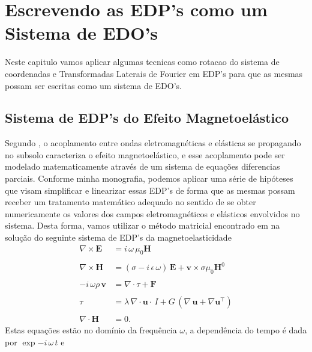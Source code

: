 \chapter{Escrevendo as EDP's como um Sistema de EDO's}
Neste capitulo vamos aplicar algumas tecnicas como rotacao do sistema de coordenadas e Transformadas Laterais de Fourier em EDP's para que as mesmas possam ser escritas como um sistema de EDO's.

\section{Sistema de EDP's do Efeito Magnetoel\'astico}

Segundo \cite{eringen_1963}, o acoplamento entre ondas eletromagn\'eticas e el\'asticas se propagando no subsolo caracteriza o efeito magnetoel\'astico, e esse acoplamento pode ser modelado matematicamente atrav\'es de um sistema de equa\c{c}\~oes diferencias parciais. Conforme minha monografia, podemos aplicar uma s\'erie de hip\'oteses que visam simplificar e linearizar essas EDP's de forma que as mesmas possam receber um tratamento matem\'atico adequado no sentido de se obter numericamente os valores dos campos eletromagn\'eticos e el\'asticos envolvidos no sistema. Desta forma, vamos utilizar o m\'etodo matricial encontrado em \cite{Ursin-1983} na solu\c{c}\~ao do seguinte sistema de EDP's da magnetoelasticidade
\begin{align}\label{eq.mag_ela_1}
\nabla\times\mathbf{{E}}&=i\,\omega\,\mu_0\mathbf{{H}}\\\nonumber\\\label{eq.mag_ela_2}
\nabla\times\mathbf{{H}}&=(\sigma-i\,\epsilon\,\omega)\,\mathbf{{E}}+\mathbf{{v}}\times\sigma\mu_0\mathbf{H}^0\\\nonumber\\\label{eq.mag_ela_3}
-i\,\omega\rho\,\mathbf{{v}}&=\nabla\cdot{\tau} + \mathbf{{F}}\\\nonumber\\\label{eq.mag_ela_4}
{\tau}&=\lambda\,\nabla\cdot\mathbf{{u}}\cdot\,I + G\,(\nabla\,\mathbf{{u}}+\nabla\mathbf{{u}}^\top)\\\nonumber\\\label{eq.mag_ela_5}
\nabla\cdot\mathbf{{H}}&=0.
\end{align}
Estas equa\c{c}\~oes est\~ao no dom\'inio da frequ\^encia $\omega$, a depend\^encia do tempo \'e dada por $\exp{-i\,\omega\,t}$ e 
